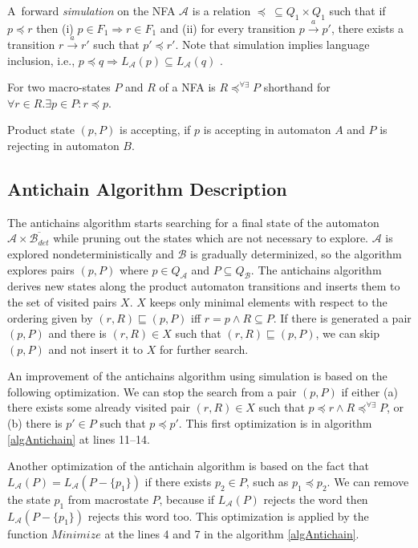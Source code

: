 A~forward \emph{simulation} on the NFA $\mathcal{A}$ is a relation $\preceq\  \subseteq Q_1 \times Q_1$ 
such that if $p \preceq r$ then (i) $p \in F_1 
\Rightarrow r \in F_1$ and (ii) for every transition $p\xrightarrow{a}p'$, there exists a transition 
$r\xrightarrow{a}r'$ such that $p' \preceq r'$. Note that simulation implies language inclusion, i.e., $p\preceq q \Rightarrow L_\mathcal{A}(p)
\subseteq L_\mathcal{A}(q)$ \cite{focs95}. %


%
For two macro-states $P$ and $R$ of a NFA is $R\preceq^{\forall\exists}P$ shorthand for $\forall r\in R.\exists p \in P: r \preceq p$.

Product state $(p,P)$ is accepting, if $p$ is accepting in automaton $A$ and $P$ is rejecting in automaton $B$.

\subsection{Antichain Algorithm Description}
The antichains algorithm \cite{cav06} starts searching for a final state of the automaton $\mathcal{A}\times \overline{\mathcal{B}_{det}}$ while
pruning out the states which are not necessary to explore. $\mathcal{A}$ is explored nondeterministically and $\mathcal{B}$ 
is gradually determinized, so the algorithm explores pairs $(p,P)$ where $p\in Q_\mathcal{A}$ and $P \subseteq Q_\mathcal{B}$. 
The antichains algorithm derives new states along the product automaton transitions and inserts them to the set of visited pairs $X$.
$X$ keeps only minimal elements with respect to the ordering given by $(r,R)\sqsubseteq (p,P)$ iff $r=p \wedge R \subseteq P$. 
If there is generated a pair $(p,P)$ and there is 
$(r,R)\in X$ such that $(r,R) \sqsubseteq (p,P)$, we can skip $(p,P)$ and not insert it to $X$ for further search.
 
An improvement of the antichains algorithm using simulation \cite{tacas10} is based on the following optimization. 
We can stop the search from a pair $(p,P)$ if either (a) there exists some already visited pair $(r,R) \in X$ 
such that $p\preceq r \wedge R\preceq^{\forall\exists}P$, 
or (b) there is $p' \in P$ such that $p \preceq p'$. This first
optimization is in algorithm \ref{algAntichain} at lines 11--14.

Another optimization \cite{tacas10} of the antichain algorithm is based on the fact 
that $L_\mathcal{A}(P)=L_\mathcal{A}(P-\{p_1\})$ if there exists $p_2 \in P$, such as $p_1 \preceq p_2$. We can remove the state $p_1$ 
from macrostate $P$, because if $L_\mathcal{A}(P)$ rejects the word 
then $L_\mathcal{A}(P-\{p_1\})$ rejects this word too. This optimization is applied by the function $Minimize$ at
the lines 4 and 7 in the algorithm \ref{algAntichain}.

